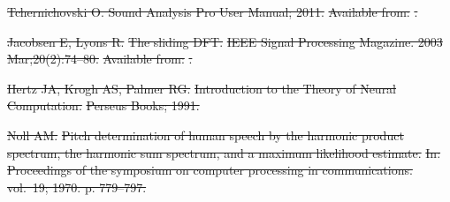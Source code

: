 \documentclass[10pt,letterpaper]{article}
\providecommand{\DIFdeltex}[1]{{\protect\color{red}\sout{#1}}}                      %
\providecommand{\DIFaddbegin}{} %
\providecommand{\DIFaddend}{} %
\providecommand{\DIFdelend}{} %
\providecommand{\DIFdel}[1]{\texorpdfstring{\DIFdeltex{#1}}{}} %
\begin{document}
\DIFdel{Tchernichovski O. Sound Analysis Pro User Manual; 2011.
}%
\DIFdel{Available from: }%
\DIFdel{.
}%

\DIFdel{Jacobsen E, Lyons R.
}%
\DIFdel{The sliding DFT.
}%
\DIFdel{IEEE Signal Processing Magazine. 2003 Mar;20(2):74--80.
}%
\DIFdel{Available from:
  }%
\DIFdel{.
}%

\DIFdel{Hertz JA, Krogh AS, Palmer RG.
}%
\DIFdel{Introduction to the Theory of Neural Computation.
}%
\DIFdel{Perseus Books; 1991.
}%

\DIFdel{Noll AM.
}%
\DIFdel{Pitch determination of human speech by the harmonic product spectrum,
  the harmonic sum spectrum, and a maximum likelihood estimate.
}%
\DIFdel{In: Proceedings of the symposium on computer processing in
  communications. vol.~19; 1970. p. 779--797.
}%

\DIFdelend \DIFaddbegin 
\DIFaddend 
\end{document}

